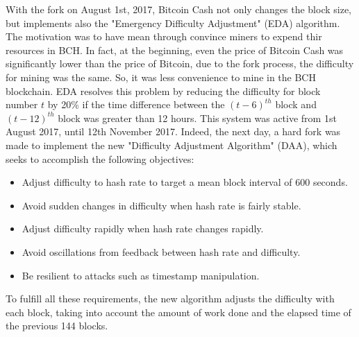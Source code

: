 With the fork on August 1st, 2017, Bitcoin Cash not only changes the block size, but 
implements also the "Emergency Difficulty Adjustment" (EDA) algorithm. The motivation was 
to have mean through convince miners to expend thir resources in BCH. In fact, at the 
beginning, even the price of Bitcoin Cash was significantly lower than the price of 
Bitcoin, due to the fork process, the difficulty for mining was the same. So, it was 
less convenience to mine in the BCH blockchain. EDA resolves this problem by reducing 
the difficulty for block number $t$ by 20\% if the time difference between the 
$(t-6)^{th}$ block and $(t-12)^{th}$ block was greater than 12 hours. This system was 
active from 1st August 2017, until 12th November 2017. Indeed, the next day, a hard fork
was made to implement the new "Difficulty Adjustment Algorithm" (DAA), which seeks to 
accomplish the following objectives:
\begin{itemize}
    \item Adjust difficulty to hash rate to target a mean block interval of 600 seconds.
    \item Avoid sudden changes in difficulty when hash rate is fairly stable.
    \item Adjust difficulty rapidly when hash rate changes rapidly.
    \item Avoid oscillations from feedback between hash rate and difficulty.
    \item Be resilient to attacks such as timestamp manipulation.
\end{itemize}
To fulfill all these requirements, the new algorithm adjusts the difficulty with each
block, taking into account the amount of work done and the elapsed time of the previous 
144 blocks.\cite{bitcoinabc}\cite{eda}\pagebreak
